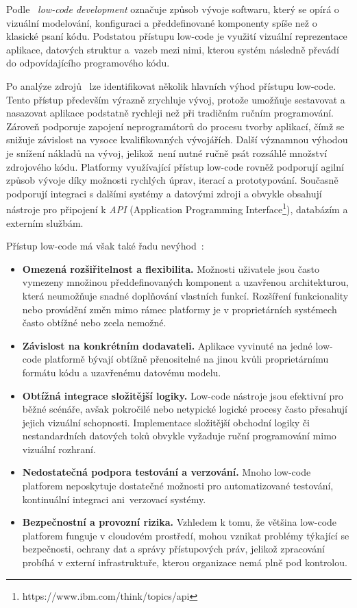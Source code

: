 Podle~\cite{LowCodePlatforms} \textit{low-code development} označuje způsob vývoje softwaru, který se opírá o vizuální modelování, konfiguraci a předdefinované komponenty spíše než o klasické psaní kódu. Podstatou přístupu low-code je využití vizuální reprezentace aplikace, datových struktur a~vazeb mezi nimi, kterou systém následně převádí do odpovídajícího programového kódu. 

Po analýze zdrojů~\cite{LowCodeKirikova,LowCodePlatforms} lze identifikovat několik hlavních výhod přístupu low-code. Tento přístup především výrazně zrychluje vývoj, protože umožňuje sestavovat a nasazovat aplikace podstatně rychleji než při tradičním ručním programování. Zároveň podporuje zapojení neprogramátorů do procesu tvorby aplikací, čímž se snižuje závislost na vysoce kvalifikovaných vývojářích. Další významnou výhodou je snížení nákladů na vývoj, jelikož~není nutné ručně psát rozsáhlé množství zdrojového kódu. Platformy využívající přístup low-code rovněž podporují agilní způsob vývoje díky možnosti rychlých úprav, iterací a prototypování. Současně podporují integraci s dalšími systémy a datovými zdroji a obvykle obsahují nástroje pro připojení k \textit{API} (Application Programming Interface\footnote{https://www.ibm.com/think/topics/api}), databázím a externím službám.

Přístup low-code má však také řadu nevýhod~\cite{LowCodeKirikova,LowCodePlatforms}:

\begin{itemize}
    \item{\textbf{Omezená rozšiřitelnost a flexibilita.} Možnosti uživatele jsou často vymezeny množinou předdefinovaných komponent a uzavřenou architekturou, která neumožňuje snadné doplňování vlastních funkcí. Rozšíření funkcionality nebo provádění změn mimo rámec platformy je v proprietárních systémech často obtížné nebo zcela nemožné.}
    \item{\textbf{Závislost na konkrétním dodavateli.} Aplikace vyvinuté na jedné low-code platformě bývají obtížně přenositelné na jinou kvůli proprietárnímu formátu kódu a uzavřenému datovému modelu.}
    \item{\textbf{Obtížná integrace složitější logiky.} Low-code nástroje jsou efektivní pro běžné scénáře, avšak pokročilé nebo netypické logické procesy často přesahují jejich vizuální schopnosti. Implementace složitější obchodní logiky či nestandardních datových toků obvykle vyžaduje ruční programování mimo vizuální rozhraní.}
    \item{\textbf{Nedostatečná podpora testování a verzování.} Mnoho low-code platforem neposkytuje dostatečné možnosti pro automatizované testování, kontinuální integraci ani~verzovací systémy.}
    \item{\textbf{Bezpečnostní a provozní rizika.} Vzhledem k tomu, že většina low-code platforem funguje v cloudovém prostředí, mohou vznikat problémy týkající se bezpečnosti, ochrany dat a správy přístupových práv, jelikož zpracování probíhá v externí infrastruktuře, kterou organizace nemá plně pod kontrolou.}
\end{itemize}

